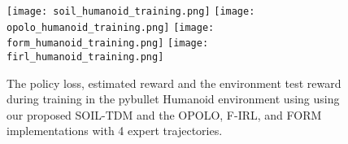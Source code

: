 \documentclass{article}
\begin{document}
\begin{figure*}[t]
\begin{center}
\texttt{[image: soil\_humanoid\_training.png]}
\texttt{[image: opolo\_humanoid\_training.png]}
\texttt{[image: form\_humanoid\_training.png]}
\texttt{[image: firl\_humanoid\_training.png]}
\caption{The policy loss, estimated reward and the environment test reward during training in the pybullet Humanoid environment using using our proposed SOIL-TDM and the OPOLO, F-IRL, and FORM implementations with 4 expert trajectories.}
\label{fig:tf2}
\end{center}
\end{figure*}
\end{document}
